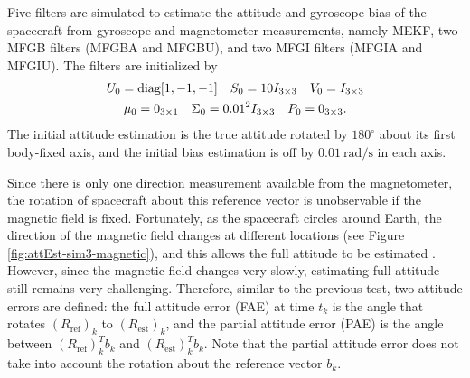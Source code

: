 Five filters are simulated to estimate the attitude and gyroscope bias of the spacecraft from gyroscope and magnetometer measurements, namely MEKF, two MFGB filters (MFGBA and MFGBU), and two MFGI filters (MFGIA and MFGIU).
The filters are initialized by
\begin{gather*}
	U_0 = \mathrm{diag}{[1,-1,-1]} \quad S_0 = 10I_{3\times 3} \quad V_0 = I_{3\times 3} \\
	\mu_0 = 0_{3\times 1} \quad \Sigma_0 = 0.01^2I_{3\times 3} \quad P_0 = 0_{3\times 3}.
\end{gather*}
The initial attitude estimation is the true attitude rotated by $180^\circ$ about its first body-fixed axis, and the initial bias estimation is off by $\SI{0.01}{\radian\per\second}$ in each axis.

Since there is only one direction measurement available from the magnetometer, the rotation of spacecraft about this reference vector is unobservable if the magnetic field is fixed.
Fortunately, as the spacecraft circles around Earth, the direction of the magnetic field changes at different locations (see Figure \ref{fig:attEst-sim3-magnetic}), and this allows the full attitude to be estimated \cite{grip2011attitude}.
However, since the magnetic field changes very slowly, estimating full attitude still remains very challenging.
Therefore, similar to the previous test, two attitude errors are defined: the full attitude error (FAE) at time $t_k$ is the angle that rotates $(R_{\mathrm{ref}})_k$ to $(R_{\mathrm{est}})_k$, and the partial attitude error (PAE) is the angle between $(R_{\mathrm{ref}})_k^Tb_k$ and $(R_{\mathrm{est}})_k^Tb_k$.
Note that the partial attitude error does not take into account the rotation about the reference vector $b_k$.

